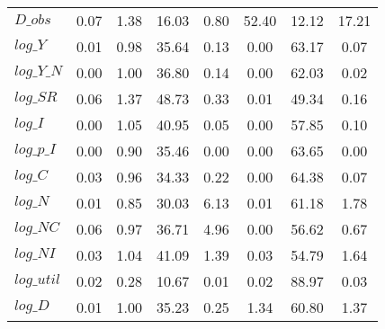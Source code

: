 \begin{center}
\begin{longtable}{lccccccc}
$D\_obs     $	 & 	        0.07	 & 	        1.38	 & 	       16.03	 & 	        0.80	 & 	       52.40	 & 	       12.12	 & 	       17.21 \\ 
$log\_Y     $	 & 	        0.01	 & 	        0.98	 & 	       35.64	 & 	        0.13	 & 	        0.00	 & 	       63.17	 & 	        0.07 \\ 
$log\_Y\_N  $	 & 	        0.00	 & 	        1.00	 & 	       36.80	 & 	        0.14	 & 	        0.00	 & 	       62.03	 & 	        0.02 \\ 
$log\_SR    $	 & 	        0.06	 & 	        1.37	 & 	       48.73	 & 	        0.33	 & 	        0.01	 & 	       49.34	 & 	        0.16 \\ 
$log\_I     $	 & 	        0.00	 & 	        1.05	 & 	       40.95	 & 	        0.05	 & 	        0.00	 & 	       57.85	 & 	        0.10 \\ 
$log\_p\_I  $	 & 	        0.00	 & 	        0.90	 & 	       35.46	 & 	        0.00	 & 	        0.00	 & 	       63.65	 & 	        0.00 \\ 
$log\_C     $	 & 	        0.03	 & 	        0.96	 & 	       34.33	 & 	        0.22	 & 	        0.00	 & 	       64.38	 & 	        0.07 \\ 
$log\_N     $	 & 	        0.01	 & 	        0.85	 & 	       30.03	 & 	        6.13	 & 	        0.01	 & 	       61.18	 & 	        1.78 \\ 
$log\_NC    $	 & 	        0.06	 & 	        0.97	 & 	       36.71	 & 	        4.96	 & 	        0.00	 & 	       56.62	 & 	        0.67 \\ 
$log\_NI    $	 & 	        0.03	 & 	        1.04	 & 	       41.09	 & 	        1.39	 & 	        0.03	 & 	       54.79	 & 	        1.64 \\ 
$log\_util  $	 & 	        0.02	 & 	        0.28	 & 	       10.67	 & 	        0.01	 & 	        0.02	 & 	       88.97	 & 	        0.03 \\ 
$log\_D     $	 & 	        0.01	 & 	        1.00	 & 	       35.23	 & 	        0.25	 & 	        1.34	 & 	       60.80	 & 	        1.37 \\ 
\end{longtable}
 \end{center}

